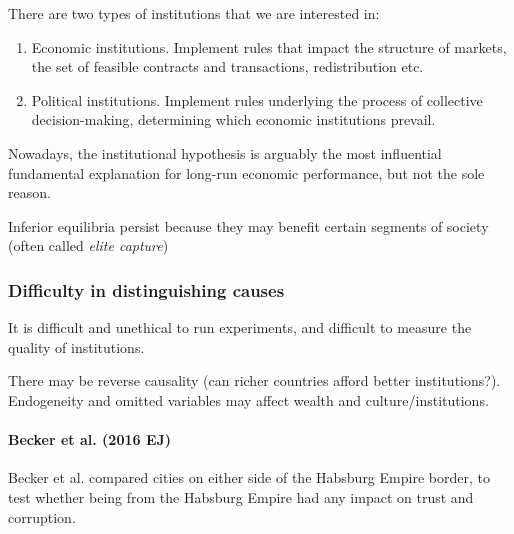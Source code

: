 \documentclass[11pt]{article}
\begin{document}
There are two types of institutions that we are interested in:
\begin{enumerate}
    \item Economic institutions. Implement rules that impact the structure of markets, the set of feasible contracts and transactions, redistribution etc.

    \item Political institutions. Implement rules underlying the process of collective decision-making, determining which economic institutions prevail.
\end{enumerate}

Nowadays, the institutional hypothesis is arguably the most influential fundamental explanation for long-run economic performance, but not the sole reason.

Inferior equilibria persist because they may benefit certain segments of society (often called \textit{elite capture})

\subsubsection{Difficulty in distinguishing causes}

It is difficult and unethical to run experiments, and difficult to measure the quality of institutions.

There may be reverse causality (can richer countries afford better institutions?). Endogeneity and omitted variables may affect wealth and culture/institutions.

\begin{mdframed}
    

\paragraph{Becker et al. (2016 EJ)} \mbox{} 

Becker et al. \cite{becker2014} compared cities on either side of the Habsburg Empire border, to test whether being from the Habsburg Empire had any impact on trust and corruption.
\end{mdframed}
\end{document}

